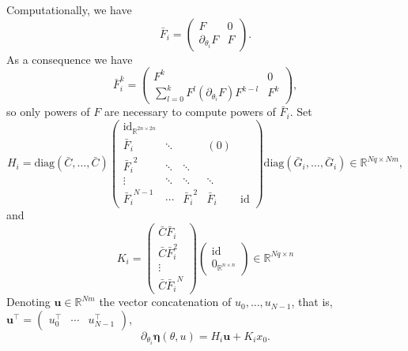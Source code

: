 \documentclass[twocolumn]{autart}
\theoremstyle{definition}
\theoremstyle{remark}
\newcommand{\R}{\mathbb{R}}
\newcommand{\id}{\mathrm{id}}
\newcommand{\ub}{\mathbf{u}}
\newcommand{\diag}{\mathrm{diag}}
\newcommand{\etab}{\boldsymbol{\eta}}
\begin{document}
Computationally, we have
\begin{equation}
    \bar{F}_i=
    \begin{pmatrix}
    F & 0
    \\
    \partial_{\theta_i} F &  F
    \end{pmatrix}.
\end{equation}
As a consequence we have
\begin{equation}
\bar F_i^k
=
\begin{pmatrix}
    F^k & 0
    \\
    \sum_{l=0}^k F^l (\partial_{\theta_i} F) F^{k-l} &  F^k
    \end{pmatrix},
\end{equation}
so only powers of $F$ are necessary to compute powers of $\bar F_i$.
Set 
\begin{equation}
H_i
=
    \diag(\bar C,\dots, \bar C)
    \begin{pmatrix}
    \id_{\R^{2n\times 2n}} &  &  &
    \\
    \bar F_i & \ddots &  &(0)
    \\
    {\bar F_i}^2  &\ddots  &\ddots& &
    \\
    \vdots &\ddots  &\ddots&\ddots &
    \\
    {\bar F_i}^{N-1}&\cdots&{\bar F_i}^2&{\bar F_i}&\id
    \end{pmatrix}
    \diag(\bar G_i,\dots, \bar G_i) \in \R^{Nq\times N m},
\end{equation}
and
\begin{equation}
    K_i
=
    \begin{pmatrix}
    \bar C \bar F_i 
    \\
    \bar C \bar F_i^2
    \\
    \vdots 
    \\
   \bar C{\bar F_i}^{N}
    \end{pmatrix}
    \begin{pmatrix}
    \id
    \\
    0_{\R^{n\times n}}
    \end{pmatrix}
    \in \R^{Nq\times n}
\end{equation}
Denoting $\ub\in \R^{Nm}$ the vector concatenation of $u_0,\dots ,u_{N-1}$, that is, $\ub^\top=\begin{pmatrix}
u_0^\top & \cdots & u_{N-1}^\top
\end{pmatrix}$,
\begin{equation}
\partial_{\theta_i}\etab(\theta,u)=H_i \ub + K_i x_0.
\end{equation}
\end{document}
